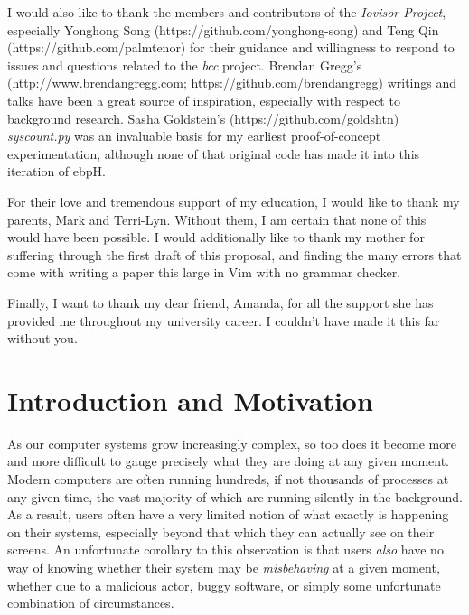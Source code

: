 \documentclass[
  12pt]{findlay}
\begin{document}
I would also like to thank the members and contributors of the
\emph{Iovisor Project}, especially Yonghong Song
(https://github.com/yonghong-song) and Teng Qin
(https://github.com/palmtenor) for their guidance and willingness to
respond to issues and questions related to the \emph{bcc} project.
Brendan Gregg's (http://www.brendangregg.com;
https://github.com/brendangregg) writings and talks have been a great
source of inspiration, especially with respect to background research.
Sasha Goldstein's (https://github.com/goldshtn) \emph{syscount.py} was
an invaluable basis for my earliest proof-of-concept experimentation,
although none of that original code has made it into this iteration of
ebpH.

For their love and tremendous support of my education, I would like to
thank my parents, Mark and Terri-Lyn. Without them, I am certain that
none of this would have been possible. I would additionally like to
thank my mother for suffering through the first draft of this proposal,
and finding the many errors that come with writing a paper this large in
Vim with no grammar checker.

Finally, I want to thank my dear friend, Amanda, for all the support she
has provided me throughout my university career. I couldn't have made it
this far without you.

\newpage
\singlespacing
\tableofcontents
\onehalfspacing

\newpage
\listoffigures
\newpage
\listoftables
\newpage
\lstlistoflistings

\newpage
{}
\setcounter{page}{1}

\hypertarget{introduction-and-motivation}{%
\section{Introduction and
Motivation}\label{introduction-and-motivation}}

As our computer systems grow increasingly complex, so too does it become
more and more difficult to gauge precisely what they are doing at any
given moment. Modern computers are often running hundreds, if not
thousands of processes at any given time, the vast majority of which are
running silently in the background. As a result, users often have a very
limited notion of what exactly is happening on their systems, especially
beyond that which they can actually see on their screens. An unfortunate
corollary to this observation is that users \emph{also} have no way of
knowing whether their system may be \emph{misbehaving} at a given
moment, whether due to a malicious actor, buggy software, or simply some
unfortunate combination of circumstances.
\end{document}
